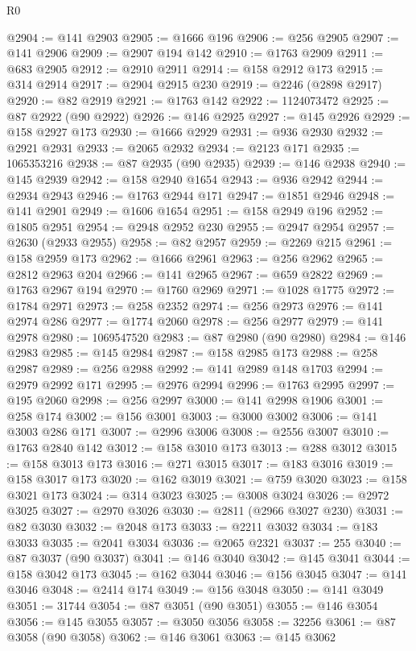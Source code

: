 \begin{lexlean}{R0}
\begin{coremodule}
@2904 := @141 @2903
@2905 := @1666 @196
@2906 := @256 @2905
@2907 := @141 @2906
@2909 := @2907 @194 @142
@2910 := @1763 @2909
@2911 := @683 @2905
@2912 := @2910 @2911
@2914 := @158 @2912 @173
@2915 := @314 @2914
@2917 := @2904 @2915 @230
@2919 := @2246 (@2898 @2917)
@2920 := @82 @2919
@2921 := @1763 @142
@2922 := 1124073472
@2925 := @87 @2922 (@90 @2922)
@2926 := @146 @2925
@2927 := @145 @2926
@2929 := @158 @2927 @173
@2930 := @1666 @2929
@2931 := @936 @2930
@2932 := @2921 @2931
@2933 := @2065 @2932
@2934 := @2123 @171
@2935 := 1065353216
@2938 := @87 @2935 (@90 @2935)
@2939 := @146 @2938
@2940 := @145 @2939
@2942 := @158 @2940 @1654
@2943 := @936 @2942
@2944 := @2934 @2943
@2946 := @1763 @2944 @171
@2947 := @1851 @2946
@2948 := @141 @2901
@2949 := @1606 @1654
@2951 := @158 @2949 @196
@2952 := @1805 @2951
@2954 := @2948 @2952 @230
@2955 := @2947 @2954
@2957 := @2630 (@2933 @2955)
@2958 := @82 @2957
@2959 := @2269 @215
@2961 := @158 @2959 @173
@2962 := @1666 @2961
@2963 := @256 @2962
@2965 := @2812 @2963 @204
@2966 := @141 @2965
@2967 := @659 @2822
@2969 := @1763 @2967 @194
@2970 := @1760 @2969
@2971 := @1028 @1775
@2972 := @1784 @2971
@2973 := @258 @2352
@2974 := @256 @2973
@2976 := @141 @2974 @286
@2977 := @1774 @2060
@2978 := @256 @2977
@2979 := @141 @2978
@2980 := 1069547520
@2983 := @87 @2980 (@90 @2980)
@2984 := @146 @2983
@2985 := @145 @2984
@2987 := @158 @2985 @173
@2988 := @258 @2987
@2989 := @256 @2988
@2992 := @141 @2989 @148 @1703
@2994 := @2979 @2992 @171
@2995 := @2976 @2994
@2996 := @1763 @2995
@2997 := @195 @2060
@2998 := @256 @2997
@3000 := @141 @2998 @1906
@3001 := @258 @174
@3002 := @156 @3001
@3003 := @3000 @3002
@3006 := @141 @3003 @286 @171
@3007 := @2996 @3006
@3008 := @2556 @3007
@3010 := @1763 @2840 @142
@3012 := @158 @3010 @173
@3013 := @288 @3012
@3015 := @158 @3013 @173
@3016 := @271 @3015
@3017 := @183 @3016
@3019 := @158 @3017 @173
@3020 := @162 @3019
@3021 := @759 @3020
@3023 := @158 @3021 @173
@3024 := @314 @3023
@3025 := @3008 @3024
@3026 := @2972 @3025
@3027 := @2970 @3026
@3030 := @2811 (@2966 @3027 @230)
@3031 := @82 @3030
@3032 := @2048 @173
@3033 := @2211 @3032
@3034 := @183 @3033
@3035 := @2041 @3034
@3036 := @2065 @2321
@3037 := 255
@3040 := @87 @3037 (@90 @3037)
@3041 := @146 @3040
@3042 := @145 @3041
@3044 := @158 @3042 @173
@3045 := @162 @3044
@3046 := @156 @3045
@3047 := @141 @3046
@3048 := @2414 @174
@3049 := @156 @3048
@3050 := @141 @3049
@3051 := 31744
@3054 := @87 @3051 (@90 @3051)
@3055 := @146 @3054
@3056 := @145 @3055
@3057 := @3050 @3056
@3058 := 32256
@3061 := @87 @3058 (@90 @3058)
@3062 := @146 @3061
@3063 := @145 @3062

\end{coremodule}
\end{lexlean}
